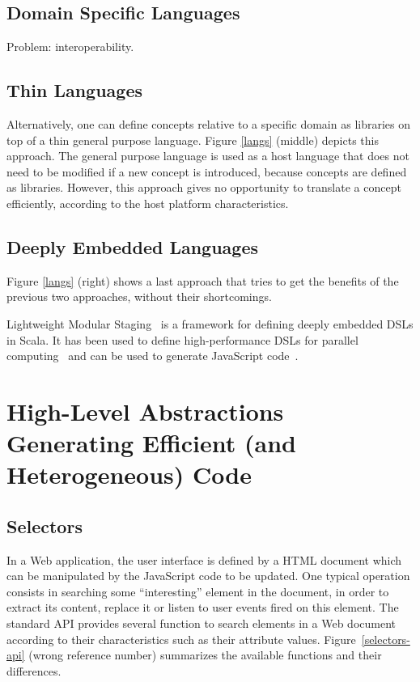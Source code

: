 \documentclass[preprint]{sigplanconf}
\begin{document}
\subsection{Domain Specific Languages}

Problem: interoperability.

\subsection{Thin Languages}

Alternatively, one can define concepts relative to a specific domain as libraries on top of a thin general purpose
language. Figure \ref{langs} (middle) depicts this approach. The general purpose language is used as a host language
that does not need to be modified if a new concept is introduced, because concepts are defined as libraries. However,
this approach gives no opportunity to translate a concept efficiently, according to the host platform
characteristics.

\subsection{Deeply Embedded Languages}

Figure \ref{langs} (right) shows a last approach that tries to get the benefits of the previous two approaches,
without their shortcomings.

Lightweight Modular Staging~\cite{Rompf12_LMSThesis} is a framework for defining deeply embedded DSLs in Scala. It
has been used to define high-performance DSLs for parallel computing~\cite{Brown11_Parallel} and can be used to
generate JavaScript code~\cite{Kossakowski12_JsDESL}.

\section{High-Level Abstractions Generating Efficient (and Heterogeneous) Code}
\label{contribution}

\subsection{Selectors}

In a Web application, the user interface is defined by a HTML document which can be manipulated by the JavaScript
code to be updated. One typical operation consists in searching some “interesting” element in the document, in order
to extract its content, replace it or listen to user events fired on this element. The standard API provides several
function to search elements in a Web document according to their characteristics such as their attribute values.
Figure~\ref{selectors-api} (wrong reference number) summarizes the available functions and their differences.
\end{document}
